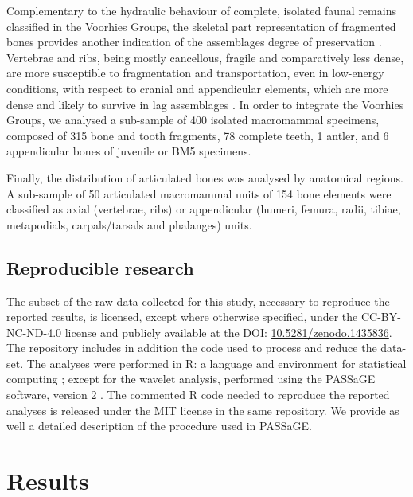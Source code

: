 \documentclass[review,times,authoryear]{elsarticle} %
\begin{document}
Complementary to the hydraulic behaviour of complete, isolated faunal remains classified in the Voorhies Groups, the skeletal part representation of fragmented bones provides another indication of the assemblages degree of preservation \citep{Dominguez-Rodrigo2014,Dominguez-Rodrigo2017,Pante2010}. Vertebrae and ribs, being mostly cancellous, fragile and comparatively less dense, are more susceptible to fragmentation and transportation, even in low-energy conditions, with respect to cranial and appendicular elements, which are more dense and likely to survive in lag assemblages \citep{Dominguez-Rodrigo2017}. In order to integrate the Voorhies Groups, we analysed a sub-sample of 400 isolated macromammal specimens, composed of 315 bone and tooth fragments, 78 complete teeth, 1 antler, and 6 appendicular bones of juvenile or BM5 specimens.

Finally, the distribution of articulated bones was analysed by anatomical regions. A sub-sample of 50 articulated macromammal units of 154 bone elements were classified as axial (vertebrae, ribs) or appendicular (humeri, femura, radii, tibiae, metapodials, carpals/tarsals and phalanges) units.

\subsection{Reproducible research}

The subset of the raw data collected for this study, necessary to reproduce the reported results, is licensed, except where otherwise specified, under the CC-BY-NC-ND-4.0 license and publicly available at the DOI: \href{https://doi.org/10.5281/zenodo.1435836}{10.5281/zenodo.1435836}. The repository includes in addition the code used to process and reduce the data-set.
The analyses were performed in \textsf{R}: a language and environment for statistical computing \citep{RCoreTeam2017}; except for the wavelet analysis, performed using the PASSaGE software, version 2 \citep{Rosenberg2011}. The commented \textsf{R} code needed to reproduce the reported analyses is released under the MIT license in the same repository. We provide as well a detailed description of the procedure used in PASSaGE.

\section{Results}
\end{document}
